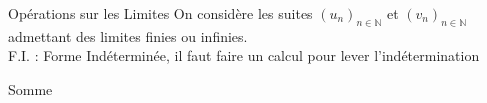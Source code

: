 \documentclass{cours}
\begin{document}
    \begin{Gpartie}{Opérations sur les Limites} 
        On considère les suites $(u_n)_{n\in\mathbb{N}}$ et $(v_n)_{n\in\mathbb{N}}$ admettant des limites finies ou infinies. \\ F.I. : Forme Indéterminée, il faut faire un calcul pour lever l'indétermination
        \begin{Spartie}{Somme}
            \begin{table}[H] \centering {} 
            \end{table}
        \end{Spartie}

\end{Gpartie}
\end{document}
